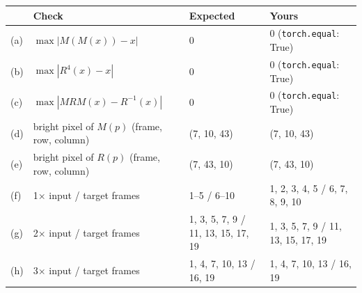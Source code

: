 \begin{tabular}{llll}
\toprule
 & Check & Expected & Yours \\
\midrule
(a) & $\max|M(M(x)) - x|$ & 0 & 0 (\texttt{torch.equal}: True) \\
(b) & $\max|R^4(x) - x|$ & 0 & 0 (\texttt{torch.equal}: True) \\
(c) & $\max|MRM(x) - R^{-1}(x)|$ & 0 & 0 (\texttt{torch.equal}: True) \\
(d) & bright pixel of $M(p)$ (frame, row, column) & (7, 10, 43) & (7, 10, 43) \\
(e) & bright pixel of $R(p)$ (frame, row, column) & (7, 43, 10) & (7, 43, 10) \\
\midrule
(f) & 1$\times$ input / target frames & 1--5 / 6--10 & 1, 2, 3, 4, 5 / 6, 7, 8, 9, 10 \\
(g) & 2$\times$ input / target frames & 1, 3, 5, 7, 9 / 11, 13, 15, 17, 19 & 1, 3, 5, 7, 9 / 11, 13, 15, 17, 19 \\
(h) & 3$\times$ input / target frames & 1, 4, 7, 10, 13 / 16, 19 & 1, 4, 7, 10, 13 / 16, 19 \\
\bottomrule
\end{tabular}
